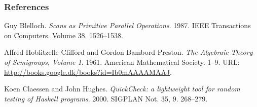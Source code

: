 \begin{frame}

\frametitle{References\footnotemark[6]}

\begin{thebibliography}{9}


Guy Blelloch. \emph{Scans as Primitive Parallel Operations}. 1987. IEEE
Transactions on Computers. Volume 38. 1526--1538.


Alfred Hoblitzelle Clifford and Gordon Bambord Preston. \emph{The Algebraic
Theory of Semigroups, Volume 1}. 1961. American Mathematical Society. 1--9.
URL: \url{http://books.google.dk/books?id=Ib0mAAAAMAAJ}.


Koen Claessen and John Hughes. \emph{QuickCheck: a lightweight tool for random
testing of Haskell programs}. 2000. SIGPLAN Not. 35, 9. 268--279.

\end{thebibliography}


\end{frame}
